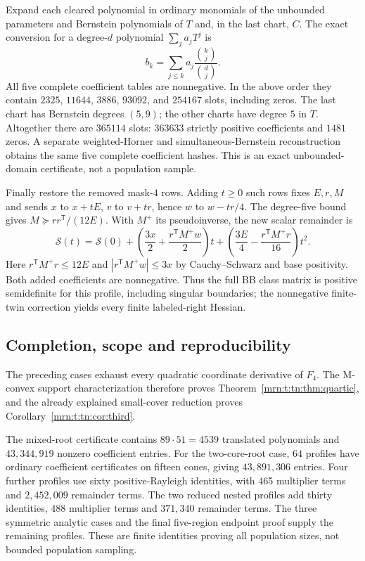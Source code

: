 \documentclass[11pt,a4paper]{article}
\theoremstyle{remark}\newtheorem{remark}[theorem]{Remark}
\begin{document}
Expand each cleared polynomial in ordinary monomials of the unbounded
parameters and Bernstein polynomials of $T$ and, in the last chart, $C$.
The exact conversion for a degree-$d$ polynomial $\sum_j a_jT^j$ is
\[
 b_k=\sum_{j\le k}a_j\frac{\binom kj}{\binom dj}.
\]
All five complete coefficient tables are nonnegative.  In the above order
they contain $2325$, $11644$, $3886$, $93092$, and $254167$ slots,
including zeros.  The last chart has Bernstein degrees $(5,9)$; the other
charts have degree $5$ in $T$.  Altogether there are $365114$ slots:
$363633$ strictly positive coefficients and $1481$ zeros.  A separate
weighted-Horner and simultaneous-Bernstein reconstruction obtains the
same five complete coefficient hashes.  This is an exact unbounded-domain
certificate, not a population sample.

Finally restore the removed mask-$4$ rows.  Adding $t\ge0$ such rows fixes
$E,r,M$ and sends $x$ to $x+tE$, $v$ to $v+tr$, hence $w$ to $w-tr/4$.
The degree-five bound gives $M\succeq rr^{\mathsf T}/(12E)$.
With $M^+$ its pseudoinverse, the new scalar remainder is
\[
 \mathcal S(t)=\mathcal S(0)
 +\left(\frac{3x}{2}+\frac{r^{\mathsf T}M^+w}{2}\right)t
 +\left(\frac{3E}{4}-\frac{r^{\mathsf T}M^+r}{16}\right)t^2.
\]
Here $r^{\mathsf T}M^+r\le12E$ and
$|r^{\mathsf T}M^+w|\le3x$ by Cauchy--Schwarz and base positivity.
Both added coefficients are nonnegative.  Thus the full BB class matrix
is positive semidefinite for this profile, including singular boundaries;
the nonnegative finite-twin correction yields every finite labeled-right
Hessian.

\subsection{Completion, scope and reproducibility}\label{mrn:t:tn:sec:completion}
The preceding cases exhaust every quadratic coordinate derivative of
$F_4$. The M-convex support characterization therefore proves
Theorem~\ref{mrn:t:tn:thm:quartic}, and the already explained small-cover reduction
proves Corollary~\ref{mrn:t:tn:cor:third}.

The mixed-root certificate contains $89\cdot51=4539$ translated
polynomials and $43{,}344{,}919$ nonzero coefficient entries. For the
two-core-root case, $64$ profiles have ordinary coefficient certificates
on fifteen cones, giving $43{,}891{,}306$ entries. Four further profiles use
sixty positive-Rayleigh identities, with 465 multiplier terms and
$2{,}452{,}009$ remainder terms. The two reduced nested profiles add thirty
identities, 488 multiplier terms and $371{,}340$ remainder terms.
The three symmetric analytic cases and the final five-region endpoint
proof supply the remaining profiles. These are finite identities proving
all population sizes, not bounded population sampling.
\end{document}
